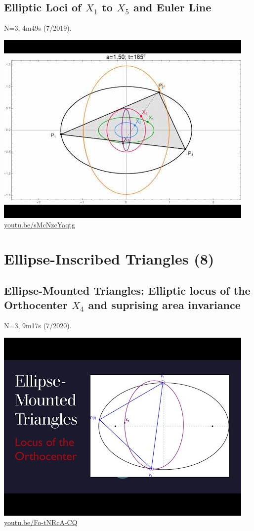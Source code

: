 \documentclass[12pt]{amsart}
\begin{document}
\subsection{Elliptic Loci of $X_{1}$ to $X_{5}$ and Euler Line}
\label{vid:sMcNzcYaqtg}
\noindent N=3, 4m49s (7/2019). 
\begin{center}\includegraphics[width=.5\textwidth]{pics/sMcNzcYaqtg.jpg} \\ 
\href{https://youtu.be/sMcNzcYaqtg}{\url{youtu.be/sMcNzcYaqtg}}\end{center}
% 


\section{Ellipse-Inscribed Triangles (8)}

\subsection{Ellipse-Mounted Triangles: Elliptic locus of the Orthocenter $X_{4}$ and suprising area invariance}
\label{vid:Fo-tNRcA-CQ}
\noindent N=3, 9m17s (7/2020). 
\begin{center}\includegraphics[width=.5\textwidth]{pics/Fo-tNRcA-CQ.jpg} \\ 
\href{https://youtu.be/Fo-tNRcA-CQ}{\url{youtu.be/Fo-tNRcA-CQ}}\end{center}
% 
\end{document}
